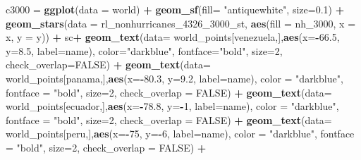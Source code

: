 \documentclass[12pt,oneside]{reedthesis}
\newenvironment{Shaded}{\begin{snugshade}}{\end{snugshade}}
\newcommand{\DataTypeTok}[1]{\textcolor[rgb]{0.13,0.29,0.53}{#1}}
\newcommand{\DecValTok}[1]{\textcolor[rgb]{0.00,0.00,0.81}{#1}}
\newcommand{\FloatTok}[1]{\textcolor[rgb]{0.00,0.00,0.81}{#1}}
\newcommand{\KeywordTok}[1]{\textcolor[rgb]{0.13,0.29,0.53}{\textbf{#1}}}
\newcommand{\NormalTok}[1]{#1}
\newcommand{\OperatorTok}[1]{\textcolor[rgb]{0.81,0.36,0.00}{\textbf{#1}}}
\newcommand{\OtherTok}[1]{\textcolor[rgb]{0.56,0.35,0.01}{#1}}
\newcommand{\StringTok}[1]{\textcolor[rgb]{0.31,0.60,0.02}{#1}}
\begin{document}
\begin{Shaded}
\begin{Highlighting}[]
\NormalTok{c3000 =}\StringTok{ }\KeywordTok{ggplot}\NormalTok{(}\DataTypeTok{data =}\NormalTok{ world) }\OperatorTok{+}\StringTok{ }
\StringTok{  }\KeywordTok{geom_sf}\NormalTok{(}\DataTypeTok{fill=} \StringTok{"antiquewhite"}\NormalTok{, }\DataTypeTok{size=}\FloatTok{0.1}\NormalTok{) }\OperatorTok{+}\StringTok{ }
\StringTok{  }\KeywordTok{geom_stars}\NormalTok{(}\DataTypeTok{data =}\NormalTok{ rl_nonhurricanes_}\DecValTok{4326}\NormalTok{_}\DecValTok{3000}\NormalTok{_st, }\KeywordTok{aes}\NormalTok{(}\DataTypeTok{fill =}\NormalTok{ nh_}\DecValTok{3000}\NormalTok{, }\DataTypeTok{x =}\NormalTok{ x, }\DataTypeTok{y =}\NormalTok{ y)) }\OperatorTok{+}\StringTok{ }
\StringTok{  }\NormalTok{sc}\OperatorTok{+}
\StringTok{  }\KeywordTok{geom_text}\NormalTok{(}\DataTypeTok{data=}\NormalTok{ world_points[venezuela,],}\KeywordTok{aes}\NormalTok{(}\DataTypeTok{x=}\OperatorTok{-}\FloatTok{66.5}\NormalTok{, }\DataTypeTok{y=}\FloatTok{8.5}\NormalTok{, }\DataTypeTok{label=}\NormalTok{name), }\DataTypeTok{color=}\StringTok{"darkblue"}\NormalTok{, }\DataTypeTok{fontface=}\StringTok{"bold"}\NormalTok{, }\DataTypeTok{size=}\DecValTok{2}\NormalTok{, }\DataTypeTok{check_overlap=}\OtherTok{FALSE}\NormalTok{) }\OperatorTok{+}
\StringTok{  }\KeywordTok{geom_text}\NormalTok{(}\DataTypeTok{data=}\NormalTok{ world_points[panama,],}\KeywordTok{aes}\NormalTok{(}\DataTypeTok{x=}\OperatorTok{-}\FloatTok{80.3}\NormalTok{, }\DataTypeTok{y=}\FloatTok{9.2}\NormalTok{, }\DataTypeTok{label=}\NormalTok{name), }\DataTypeTok{color =} \StringTok{"darkblue"}\NormalTok{, }\DataTypeTok{fontface =} \StringTok{"bold"}\NormalTok{, }\DataTypeTok{size=}\DecValTok{2}\NormalTok{, }\DataTypeTok{check_overlap =} \OtherTok{FALSE}\NormalTok{) }\OperatorTok{+}\StringTok{ }
\StringTok{  }\KeywordTok{geom_text}\NormalTok{(}\DataTypeTok{data=}\NormalTok{ world_points[ecuador,],}\KeywordTok{aes}\NormalTok{(}\DataTypeTok{x=}\OperatorTok{-}\FloatTok{78.8}\NormalTok{, }\DataTypeTok{y=}\OperatorTok{-}\DecValTok{1}\NormalTok{, }\DataTypeTok{label=}\NormalTok{name), }\DataTypeTok{color =} \StringTok{"darkblue"}\NormalTok{, }\DataTypeTok{fontface =} \StringTok{"bold"}\NormalTok{, }\DataTypeTok{size=}\DecValTok{2}\NormalTok{, }\DataTypeTok{check_overlap =} \OtherTok{FALSE}\NormalTok{) }\OperatorTok{+}
\StringTok{  }\KeywordTok{geom_text}\NormalTok{(}\DataTypeTok{data=}\NormalTok{ world_points[peru,],}\KeywordTok{aes}\NormalTok{(}\DataTypeTok{x=}\OperatorTok{-}\DecValTok{75}\NormalTok{, }\DataTypeTok{y=}\OperatorTok{-}\DecValTok{6}\NormalTok{, }\DataTypeTok{label=}\NormalTok{name), }\DataTypeTok{color =} \StringTok{"darkblue"}\NormalTok{, }\DataTypeTok{fontface =} \StringTok{"bold"}\NormalTok{, }\DataTypeTok{size=}\DecValTok{2}\NormalTok{, }\DataTypeTok{check_overlap =} \OtherTok{FALSE}\NormalTok{) }\OperatorTok{+}

\end{Highlighting}
\end{Shaded}
\end{document}
